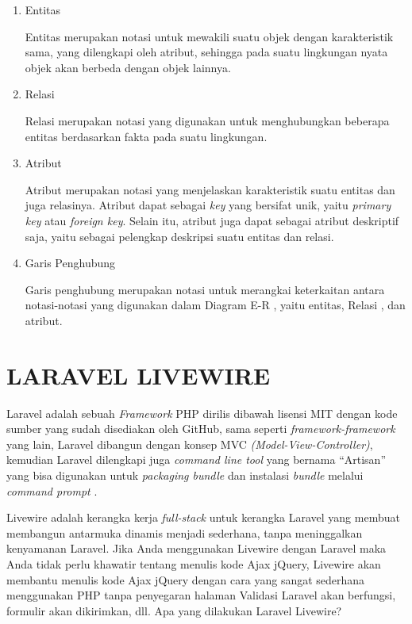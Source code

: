 \begin{enumerate}
	\item Entitas
	\par Entitas merupakan notasi untuk mewakili suatu objek dengan karakteristik sama, yang dilengkapi oleh atribut, sehingga pada suatu lingkungan nyata objek akan berbeda dengan objek lainnya.
	\item Relasi
	\par Relasi merupakan notasi yang digunakan untuk menghubungkan beberapa entitas berdasarkan fakta pada suatu lingkungan.
	\item Atribut
	\par Atribut merupakan notasi yang menjelaskan karakteristik suatu entitas dan juga relasinya. Atribut dapat sebagai \textit{key} yang bersifat unik, yaitu \textit{primary key} atau \textit{foreign key}. Selain itu, atribut juga dapat sebagai atribut deskriptif saja, yaitu sebagai pelengkap deskripsi suatu entitas dan relasi.	
	\item Garis Penghubung
	\par Garis penghubung merupakan notasi untuk merangkai keterkaitan antara notasi-notasi yang digunakan dalam Diagram E-R , yaitu entitas, Relasi , dan atribut.
\end{enumerate}

\section{\uppercase{Laravel Livewire}}
\par Laravel adalah sebuah \textit{Framework} PHP dirilis dibawah lisensi MIT dengan kode sumber yang sudah disediakan oleh GitHub, sama seperti \textit{framework-framework} yang lain, Laravel dibangun dengan konsep MVC \textit{(Model-View-Controller)}, kemudian Laravel dilengkapi juga \textit{command line tool} yang bernama “Artisan” yang bisa digunakan untuk \textit{packaging bundle} dan instalasi \textit{bundle} melalui \textit{command prompt} \citep{aminudin2015}.

\par Livewire adalah kerangka kerja \textit{full-stack} untuk kerangka Laravel yang membuat membangun antarmuka dinamis menjadi sederhana, tanpa meninggalkan kenyamanan Laravel. Jika Anda menggunakan Livewire dengan Laravel maka Anda tidak perlu khawatir tentang menulis kode Ajax jQuery, Livewire akan membantu menulis kode Ajax jQuery dengan cara yang sangat sederhana menggunakan PHP tanpa penyegaran halaman Validasi Laravel akan berfungsi, formulir akan dikirimkan, dll. Apa yang dilakukan Laravel Livewire? \citep{krishaweb2021}

